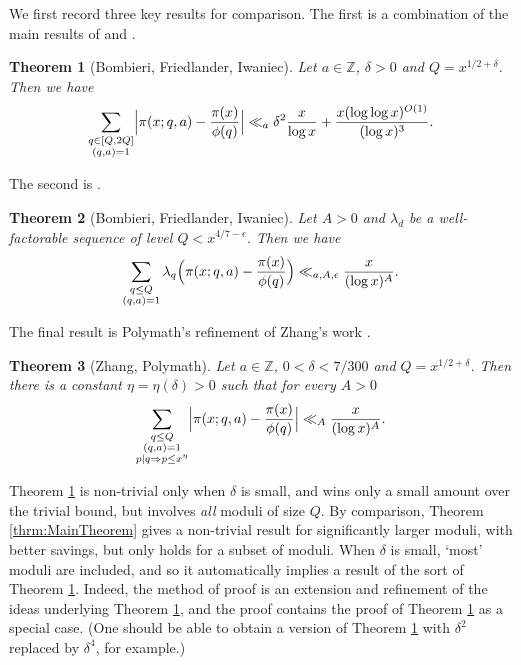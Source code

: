 \documentclass[10pt]{amsart}
\theoremstyle{plain}
\newtheorem{nthrm}{Theorem}
\numberwithin{equation}{section}
\begin{document}
We first record three key results for comparison. The first is a combination of the main results of \cite{BFI2} and \cite{BFI3}.
%
%
%
%
%
%
%
%
\begin{nthrm}[Bombieri, Friedlander, Iwaniec]\label{nthrm:BFI2}
Let $a\in\mathbb{Z}$, $\delta>0$ and $Q=x^{1/2+\delta}$. Then we have
\[
\sum_{\substack{q\in[Q,2Q]\\(q,a)=1}}\Bigl|\pi(x;q,a)-\frac{\pi(x)}{\phi(q)}\Bigr|\ll_a\delta^2\frac{x}{\log{x}}+\frac{x(\log\log{x})^{O(1)}}{(\log{x})^3}.
\]
\end{nthrm}
%
%
%
%
%
%
%
%
The second is \cite[Theorem 10]{BFI1}.
%
%
%
%
%
%
%
%
\begin{nthrm}[Bombieri, Friedlander, Iwaniec]\label{nthrm:BFI}
Let $A>0$ and $\lambda_d$ be a well-factorable sequence of level $Q<x^{4/7-\epsilon}$. Then we have
\[
\sum_{\substack{q\le Q\\ (q,a)=1}}\lambda_q\Bigl(\pi(x;q,a)-\frac{\pi(x)}{\phi(q)}\Bigr)\ll_{a,A,\epsilon}\frac{x}{(\log{x})^A}.
\]
\end{nthrm}
%
%
%
%
%
%
%
%
The final result is Polymath's refinement \cite{Polymath} of Zhang's work \cite{Zhang}.
%
%
%
%
%
%
%
%
\begin{nthrm}[Zhang, Polymath]\label{nthrm:Zhang}
Let $a\in\mathbb{Z}$, $0<\delta<7/300$ and $Q=x^{1/2+\delta}$. Then there is a constant $\eta=\eta(\delta)>0$ such that for every $A>0$
\[
\sum_{\substack{q\le Q \\(q,a)=1\\ p|q\Rightarrow p\le x^\eta}}\Bigl|\pi(x;q,a)-\frac{\pi(x)}{\phi(q)}\Bigr|\ll_A\frac{x}{(\log{x})^A}.
\]
\end{nthrm}
%
%
%
%
%
%
%
%
Theorem \ref{nthrm:BFI2} is non-trivial only when $\delta$ is small, and wins only a small amount over the trivial bound, but involves \emph{all} moduli of size $Q$. By comparison, Theorem \ref{thrm:MainTheorem} gives a non-trivial result for significantly larger moduli, with better savings, but only holds for a subset of moduli. When $\delta$ is small, `most' moduli are included, and so it automatically implies a result of the sort of Theorem \ref{nthrm:BFI2}. Indeed, the method of proof is an extension and refinement of the ideas underlying Theorem \ref{nthrm:BFI2}, and the proof contains the proof of Theorem \ref{nthrm:BFI2} as a special case. (One should be able to obtain a version of Theorem \ref{nthrm:BFI2} with $\delta^2$ replaced by $\delta^4$, for example.)
\end{document}
